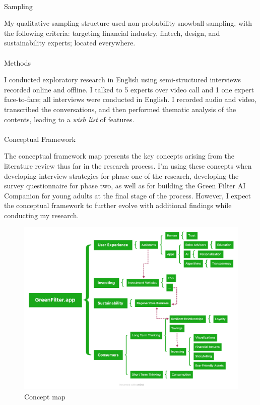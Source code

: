 \documentclass[
  12pt,
  letterpaper,
  DIV=11,
  numbers=noendperiod]{scrartcl}
\makeatletter
\let\oldparagraph\paragraph
\renewcommand{\paragraph}{
    \@ifstar
      \xxxParagraphStar
      \xxxParagraphNoStar
  }
\newcommand{\xxxParagraphStar}[1]{\oldparagraph*{#1}\mbox{}}
\newcommand{\xxxParagraphNoStar}[1]{\oldparagraph{#1}\mbox{}}
\makeatother
\begin{document}
\paragraph{Sampling}\label{sampling}

My qualitative sampling structure used non-probability snowball
sampling, with the following criteria: targeting financial industry,
fintech, design, and sustainability experts; located everywhere.

\paragraph{Methods}\label{methods}

I conducted exploratory research in English using semi-structured
interviews recorded online and offline. I talked to 5 experts over video
call and 1 one expert face-to-face; all interviews were conducted in
English. I recorded audio and video, transcribed the conversations, and
then performed thematic analysis of the contents, leading to a
\emph{wish list} of features.

\paragraph{Conceptual Framework}\label{conceptual-framework}

The conceptual framework map presents the key concepts arising from the
literature review thus far in the research process. I'm using these
concepts when developing interview strategies for phase one of the
research, developing the survey questionnaire for phase two, as well as
for building the Green Filter AI Companion for young adults at the final
stage of the process. However, I expect the conceptual framework to
further evolve with additional findings while conducting my research.

\begin{figure}[H]

{\centering \includegraphics[width=1\linewidth,height=\textheight,keepaspectratio]{./images/methodology/concept-map.png}

}

\caption{Concept map}

\end{figure}%
\end{document}
